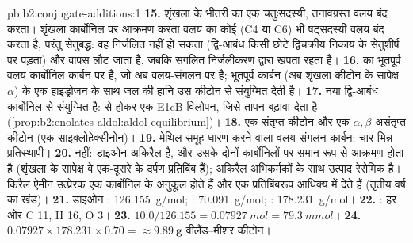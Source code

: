 \begin{solution}{pb:b2:conjugate-additions:1}
\textbf{15.} शृंखला के भीतरी  का  एक चतुःसदस्यी, तनावग्रस्त वलय बंद करता। शृंखला कार्बोनिल पर आक्रमण करता
वलय का कोई  (C4 या C6) भी षट्सदस्यी वलय बंद करता है, परंतु सेतुबद्ध: वह 
निर्जलित नहीं हो सकता (द्वि-आबंध किसी छोटे द्विचक्रीय निकाय के सेतुशीर्ष पर पड़ता) और वापस लौट जाता है,
जबकि संगलित  निर्जलीकरण द्वारा खपता रहता है।
\textbf{16.}  का  भूतपूर्व वलय कार्बोनिल कार्बन पर है, जो अब वलय-संगलन पर है; भूतपूर्व
 कार्बन (अब शृंखला कीटोन के सापेक्ष $\alpha$) के एक हाइड्रोजन के साथ जल की हानि
उस कीटोन से संयुग्मित  देती है।
\textbf{17.} नया द्वि-आबंध कार्बोनिल से संयुग्मित है:  से होकर एक E1cB विलोपन,
जिसे तापन बढ़ावा देता है (\cref{prop:b2:enolates-aldol:aldol-equilibrium})।
\textbf{18.} एक संतृप्त कीटोन और एक $\alpha,\beta$-असंतृप्त कीटोन (एक साइक्लोहेक्सीनोन)।
\textbf{19.} मेथिल समूह धारण करने वाला वलय-संगलन कार्बन: चार भिन्न प्रतिस्थापी।
\textbf{20.} नहीं: डाइओन अकिरैल है, और उसके दोनों कार्बोनिलों पर समान रूप से आक्रमण होता है (शृंखला के सापेक्ष वे
एक-दूसरे के दर्पण प्रतिबिंब हैं); अकिरैल अभिकर्मकों के साथ उत्पाद रेसेमिक है। किरैल ऐमीन
उत्प्रेरक एक कार्बोनिल के अनुकूल होते हैं और एक प्रतिबिंबरूप आधिक्य में देते हैं (तृतीय वर्ष का खंड)।
\textbf{21.} डाइओन : \qty{126.155}{g/mol}; : \qty{70.091}{g/mol}; :
\qty{178.231}{g/mol}।
\textbf{22.} : हर ओर C 11, H 16, O 3।
\textbf{23.} $10.0/126.155 = \qty{0.07927}{mol} = \qty{79.3}{mmol}$।
\textbf{24.} $0.07927 \times 178.231 \times 0.70 = \boldsymbol{\approx \qty{9.89}{g}}$
वीलैंड--मीशर कीटोन।
\end{solution}
